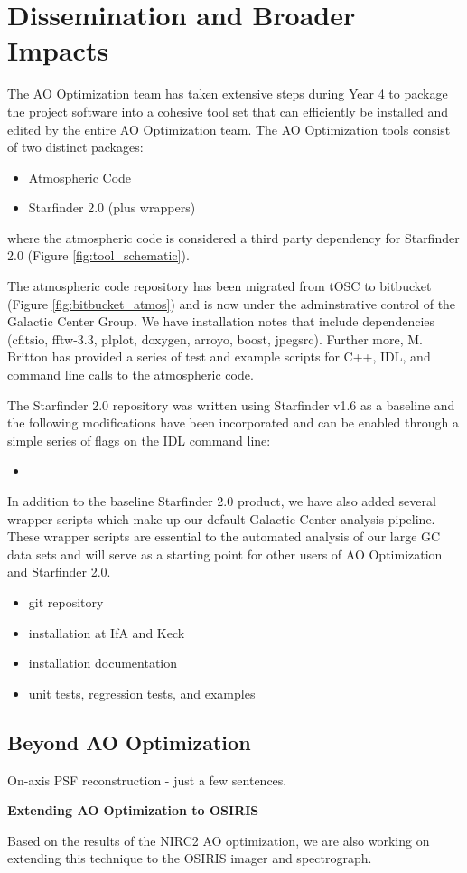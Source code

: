 \section{Dissemination and Broader Impacts}
\label{sec:dissemination}

The AO Optimization team has taken extensive steps during Year 4 to 
package the project software into a cohesive tool set that can
efficiently be installed and edited by the entire AO Optimization
team. The AO Optimization tools consist of two distinct packages:
\begin{itemize}
\item Atmospheric Code
\item Starfinder 2.0 (plus wrappers)
\end{itemize}
where the atmospheric code is considered a third party dependency for
Starfinder 2.0 (Figure \ref{fig:tool_schematic}).

The atmospheric code repository has been migrated from tOSC to
bitbucket (Figure \ref{fig:bitbucket_atmos}) and is now under the
adminstrative control of the Galactic Center Group. We have
installation notes that include dependencies (cfitsio, fftw-3.3,
plplot, doxygen, arroyo, boost, jpegsrc). Further more, M. Britton has
provided a series of test and example scripts for C++, IDL, and
command line calls to the atmospheric code. 

The Starfinder 2.0 repository was written using Starfinder v1.6 as a
baseline and the following modifications have been incorporated and
can be enabled through a simple series of flags on the IDL command
line:
\begin{itemize}
\item
\end{itemize}
In addition to the baseline Starfinder 2.0 product, we have also
added several wrapper scripts which make up our default Galactic
Center analysis pipeline. These wrapper scripts are essential to the
automated analysis of our large GC data sets and will serve as a
starting point for other users of AO Optimization and Starfinder 2.0.



\begin{itemize}
\item git repository
\item installation at IfA and Keck
\item installation documentation
\item unit tests, regression tests, and examples
\end{itemize}

\subsection{Beyond AO Optimization}

On-axis PSF reconstruction - just a few sentences.

\textbf{Extending AO Optimization to OSIRIS}
\label{sec:osiris}

Based on the results of the NIRC2 AO optimization, we are also working on extending this technique to the OSIRIS imager and spectrograph. 
